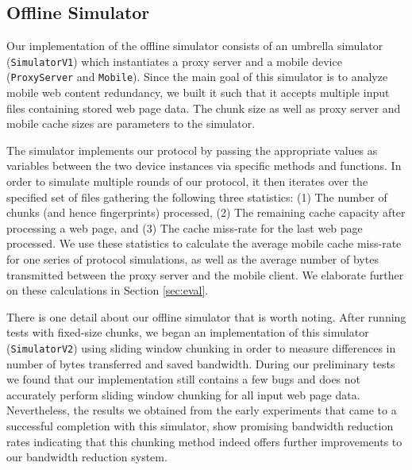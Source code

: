 \subsection{Offline Simulator}
\label{sec:offline_sim}
Our implementation of the offline simulator consists of an umbrella simulator (\texttt{SimulatorV1}) which instantiates a proxy server and a mobile device (\texttt{ProxyServer} and \texttt{Mobile}). Since the main goal of this simulator is to analyze mobile web content redundancy, we built it such that it accepts multiple input files containing stored web page data. The chunk size as well as proxy server and mobile cache sizes are parameters to the simulator.

The simulator implements our protocol by passing the appropriate values as variables between the two device instances via specific methods and functions. In order to simulate multiple rounds of our protocol, it then iterates over the specified set of files gathering the following three statistics: (1) The number of chunks (and hence fingerprints) processed, (2) The remaining cache capacity after processing a web page, and (3) The cache miss-rate for the last web page processed. We use these statistics to calculate the average mobile cache miss-rate for one series of protocol simulations, as well as the average number of bytes transmitted between the proxy server and the mobile client. We elaborate further on these calculations in Section \ref{sec:eval}.

There is one detail about our offline simulator that is worth noting. After running tests with fixed-size chunks, we began an implementation of this simulator (\texttt{SimulatorV2}) using sliding window chunking in order to measure differences in number of bytes transferred and saved bandwidth. During our preliminary tests we found that our implementation still contains a few bugs and does not accurately perform sliding window chunking for all input web page data. Nevertheless, the results we obtained from the early experiments that came to a successful completion with this simulator, show promising bandwidth reduction rates indicating that this chunking method indeed offers further improvements to our bandwidth reduction system.

